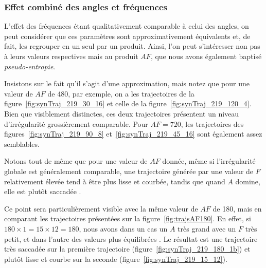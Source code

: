 	\subsubsection{Effet combiné des angles et fréquences}
	L'effet des fréquences étant qualitativement comparable à celui des angles, on peut considérer que ces paramètres sont approximativement équivalents et, de fait, les regrouper en un seul par un produit. Ainsi, l'on peut s'intéresser non pas à leurs valeurs respectives mais au produit $AF$, que nous avons également baptisé \emph{pseudo-entropie}.
	
	Insistons sur le fait qu'il s'agit d'une approximation, mais notez que pour une valeur de $AF$ de 480, par exemple, on a les trajectoires de la figure~\ref{fig:synTraj_219_30_16} et celle de la figure~\ref{fig:synTraj_219_120_4}. Bien que visiblement distinctes, ces deux trajectoires présentent un niveau d'irrégularité grossièrement comparable. Pour $AF = 720$, les trajectoires des figures~\ref{fig:synTraj_219_90_8} et~\ref{fig:synTraj_219_45_16} sont également assez semblables.
	
	Notons tout de même que pour une valeur de $AF$ donnée, même si l'irrégularité globale est généralement comparable, une trajectoire générée par une valeur de $F$ relativement élevée tend à être plus lisse et courbée, tandis que quand $A$ domine, elle est plutôt \og saccadée \fg{}.
	
	Ce point sera particulièrement visible avec la même valeur de $AF$ de 180, mais en comparant les trajectoires présentées sur la figure~\ref{fig:trajsAF180}. En effet, si $180 \times 1 = 15 \times 12 = 180$, nous avons dans un cas un $A$ très grand avec un $F$ très petit, et dans l'autre des valeurs plus \og équilibrées \fg{}. Le résultat est une trajectoire très saccadée sur la première trajectoire (figure~\ref{fig:synTraj_219_180_1b}) et plutôt lisse et courbe sur la seconde (figure~\ref{fig:synTraj_219_15_12}).
	
